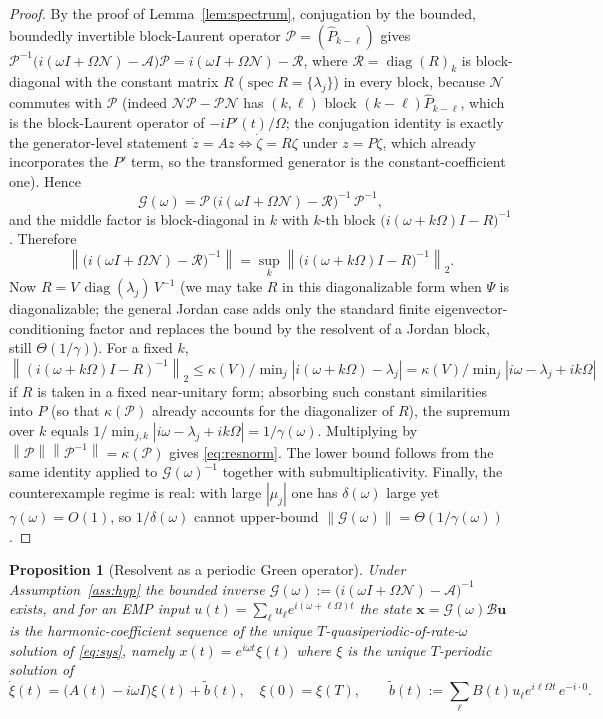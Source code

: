 \documentclass{amsart}
\newtheorem{proposition}{Proposition}
\theoremstyle{definition}
\DeclareMathOperator{\spec}{spec}
\DeclareMathOperator{\diag}{diag}
\newcommand{\norm}[1]{\left\lVert#1\right\rVert}
\newcommand{\Acal}{\mathcal{A}}
\newcommand{\Bcal}{\mathcal{B}}
\newcommand{\Ncal}{\mathcal{N}}
\begin{document}
\begin{proof}
By the proof of Lemma~\ref{lem:spectrum}, conjugation by the bounded, boundedly
invertible block-Laurent operator $\mathcal P=(\hat P_{k-\ell})$ gives
$\mathcal P^{-1}\big(i(\omega I+\Omega\Ncal)-\Acal\big)\mathcal P
=i(\omega I+\Omega\Ncal)-\mathcal R$, where $\mathcal R=\diag(R)_k$ is
block-diagonal with the constant matrix $R$ ($\spec R=\{\lambda_j\}$) in every
block, because $\Ncal$ commutes with $\mathcal P$ (indeed
$\Ncal\mathcal P-\mathcal P\Ncal$ has $(k,\ell)$ block $(k-\ell)\hat P_{k-\ell}$,
which is the block-Laurent operator of $-iP'(t)/\Omega$; the conjugation
identity is exactly the generator-level statement $\dot z=Az\Leftrightarrow
\dot\zeta=R\zeta$ under $z=P\zeta$, which already incorporates the $P'$ term, so
the transformed generator is the constant-coefficient one). Hence
\[
\mathcal G(\omega)=\mathcal P\,\big(i(\omega I+\Omega\Ncal)-\mathcal R\big)^{-1}\,\mathcal P^{-1},
\]
and the middle factor is block-diagonal in $k$ with $k$-th block
$\big(i(\omega+k\Omega)I-R\big)^{-1}$. Therefore
\[
\norm{\big(i(\omega I+\Omega\Ncal)-\mathcal R\big)^{-1}}
=\sup_k\norm{\big(i(\omega+k\Omega)I-R\big)^{-1}}_2 .
\]
Now $R=V\,\diag(\lambda_j)\,V^{-1}$ (we may take $R$ in this diagonalizable form
when $\Psi$ is diagonalizable; the general Jordan case adds only the standard
finite eigenvector-conditioning factor and replaces the bound by the resolvent
of a Jordan block, still $\Theta(1/\gamma)$). For a fixed $k$,
$\norm{(i(\omega+k\Omega)I-R)^{-1}}_2\le \kappa(V)/\min_j|i(\omega+k\Omega)-\lambda_j|
=\kappa(V)/\min_j|i\omega-\lambda_j+ik\Omega|$ if $R$ is taken in a fixed
near-unitary form; absorbing such constant similarities into $P$ (so that
$\kappa(\mathcal P)$ already accounts for the diagonalizer of $R$), the supremum
over $k$ equals $1/\min_{j,k}|i\omega-\lambda_j+ik\Omega|=1/\gamma(\omega)$.
Multiplying by $\norm{\mathcal P}\norm{\mathcal P^{-1}}=\kappa(\mathcal P)$ gives
\eqref{eq:resnorm}. The lower bound follows from the same identity applied to
$\mathcal G(\omega)^{-1}$ together with submultiplicativity. Finally, the
counterexample regime is real: with large $|\mu_j|$ one has $\delta(\omega)$
large yet $\gamma(\omega)=O(1)$, so $1/\delta(\omega)$ cannot upper-bound
$\norm{\mathcal G(\omega)}=\Theta(1/\gamma(\omega))$.
\end{proof}

\begin{proposition}[Resolvent as a periodic Green operator]\label{prop:green}
Under Assumption~\ref{ass:hyp} the bounded inverse
$\mathcal G(\omega):=\big(i(\omega I+\Omega\Ncal)-\Acal\big)^{-1}$ exists, and
for an EMP input $u(t)=\sum_\ell u_\ell e^{i(\omega+\ell\Omega)t}$ the state
$\mathbf x=\mathcal G(\omega)\Bcal\mathbf u$ is the harmonic-coefficient
sequence of the \emph{unique} $T$-quasiperiodic-of-rate-$\omega$ solution of
\eqref{eq:sys}, namely $x(t)=e^{i\omega t}\xi(t)$ where $\xi$ is the unique
$T$-periodic solution of
\begin{equation}\label{eq:bvp}
\dot\xi(t)=\big(A(t)-i\omega I\big)\xi(t)+\tilde b(t),\quad \xi(0)=\xi(T),\qquad
\tilde b(t):=\sum_\ell B(t)u_\ell e^{i\ell\Omega t}\,e^{-i\cdot 0}.
\end{equation}
\end{proposition}
\end{document}
